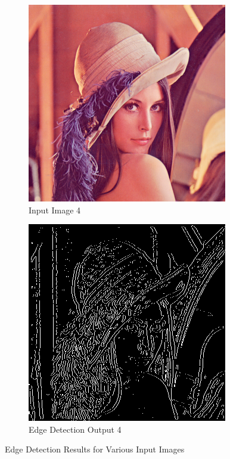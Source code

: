 \documentclass[12pt]{article}
\begin{document}
\begin{figure}[!ht]
	\begin{subfigure}{0.4\textwidth}
		\includegraphics[width=\textwidth]{../images/lenna.png}
		\caption{Input Image 4}
	\end{subfigure}
	\hfill
	\begin{subfigure}{0.4\textwidth}
		\includegraphics[width=\textwidth]{../results/lenna.png}
		\caption{Edge Detection Output 4}
	\end{subfigure}

	\caption{Edge Detection Results for Various Input Images}
\end{figure}
\end{document}
